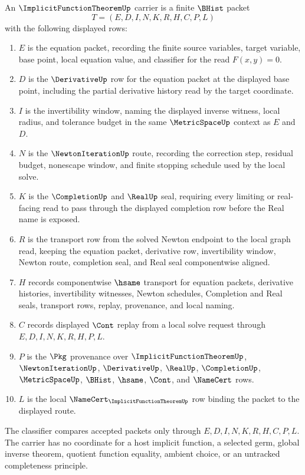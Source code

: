 \begin{definition}
\label{def:implicit-function-theorem-carrier}
An $\ImplicitFunctionTheoremUp$ carrier is a finite $\BHist$ packet
$$
T=(E,D,I,N,K,R,H,C,P,L)
$$
with the following displayed rows:
\begin{enumerate}
\item $E$ is the equation packet, recording the finite source variables, target variable, base point, local equation value, and classifier for the read $F(x,y)=0$.
\item $D$ is the $\DerivativeUp$ row for the equation packet at the displayed base point, including the partial derivative history read by the target coordinate.
\item $I$ is the invertibility window, naming the displayed inverse witness, local radius, and tolerance budget in the same $\MetricSpaceUp$ context as $E$ and $D$.
\item $N$ is the $\NewtonIterationUp$ route, recording the correction step, residual budget, nonescape window, and finite stopping schedule used by the local solve.
\item $K$ is the $\CompletionUp$ and $\RealUp$ seal, requiring every limiting or real-facing read to pass through the displayed completion row before the Real name is exposed.
\item $R$ is the transport row from the solved Newton endpoint to the local graph read, keeping the equation packet, derivative row, invertibility window, Newton route, completion seal, and Real seal componentwise aligned.
\item $H$ records componentwise $\hsame$ transport for equation packets, derivative histories, invertibility witnesses, Newton schedules, Completion and Real seals, transport rows, replay, provenance, and local naming.
\item $C$ records displayed $\Cont$ replay from a local solve request through $E,D,I,N,K,R,H,P,L$.
\item $P$ is the $\Pkg$ provenance over $\ImplicitFunctionTheoremUp$, $\NewtonIterationUp$, $\DerivativeUp$, $\RealUp$, $\CompletionUp$, $\MetricSpaceUp$, $\BHist$, $\hsame$, $\Cont$, and $\NameCert$ rows.
\item $L$ is the local $\NameCert_{\ImplicitFunctionTheoremUp}$ row binding the packet to the displayed route.
\end{enumerate}
The classifier compares accepted packets only through $E,D,I,N,K,R,H,C,P,L$. The carrier has no coordinate for a host implicit function, a selected germ, global inverse theorem, quotient function equality, ambient choice, or an untracked completeness principle.
\end{definition}


